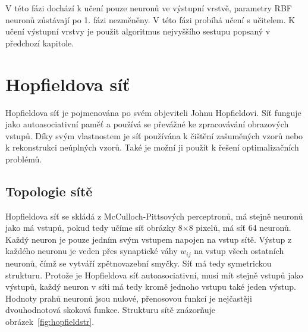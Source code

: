 \documentclass[11pt,twoside,a4paper]{book}
\begin{document}
\begin{itemize}
V této fázi dochází k učení pouze neuronů ve výstupní vrstvě, parametry RBF neuronů zůstávají po 1. fázi nezměněny. V této fázi probíhá učení s učitelem. K učení výstupní vrstvy je použit algoritmus nejvyššího sestupu popsaný v předchozí kapitole.
\end{itemize} 

\section{Hopfieldova síť}
Hopfieldova síť je pojmenována po svém objeviteli Johnu Hopfieldovi. Síť funguje jako autoasociativní paměť a používá se převážné ke zpracovávání obrazových vstupů. Díky svým vlastnostem je síť používána k čištění zašuměných vzorů nebo k rekonstrukci neúplných vzorů. Také je možní ji použít k řešení optimalizačních problémů.

\subsection{Topologie sítě}
Hopfieldova síť se skládá z McCulloch-Pittsových perceptronů, má stejně neuronů jako má vstupů, pokud tedy učíme síť obrázky 8\begin{math}\times\end{math}8 pixelů, má síť 64 neuronů. Každý neuron je pouze jedním svým vstupem napojen na vstup sítě. Výstup z každého neuronu je veden přes synaptické váhy \begin{math}w_{ij}\end{math} na vstup všech ostatních neuronů, čímž se vytváří zpětnovazební smyčky. Síť má tedy symetrickou strukturu. Protože je Hopfieldova síť autoasociativní, musí mít stejně vstupů jako výstupů, každý neuron v síti má tedy kromě jednoho vstupu také jeden výstup. Hodnoty prahů neuronů jsou nulové, přenosovou funkcí je nejčastěji dvouhodnotová skoková funkce. Strukturu sítě znázorňuje obrázek~\ref{fig:hopfieldstr}.
\end{document}
